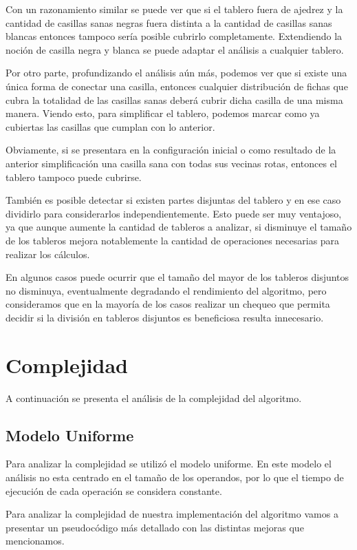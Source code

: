 \documentclass[a4paper, 12pt] {article}
\begin{document}
Con un razonamiento similar se puede ver que si el tablero fuera de ajedrez y la cantidad de casillas sanas negras fuera distinta a la cantidad de casillas sanas blancas entonces tampoco ser\'ia posible cubrirlo completamente. Extendiendo la noci\'on de casilla negra y blanca se puede adaptar el an\'alisis a cualquier tablero.


Por otro parte, profundizando el an\'alisis a\'un m\'as, podemos ver que si existe una \'unica forma de conectar una casilla, entonces cualquier distribuci\'on de fichas que cubra la totalidad de las casillas sanas deber\'a cubrir dicha casilla de una misma manera. Viendo esto, para simplificar el tablero, podemos marcar como ya cubiertas las casillas que cumplan con lo anterior.


Obviamente, si se presentara en la configuraci\'on inicial o como resultado de la anterior simplificaci\'on una casilla sana con todas sus vecinas rotas, entonces el tablero tampoco puede cubrirse.


Tambi\'en es posible detectar si existen partes disjuntas del tablero y en ese caso dividirlo para considerarlos independientemente. Esto puede ser muy ventajoso, ya que aunque aumente la cantidad de tableros a analizar, si disminuye el tama\~no de los tableros mejora notablemente la cantidad de operaciones necesarias para realizar los c\'alculos. 


En algunos casos puede ocurrir que el tama\~no del mayor de los tableros disjuntos no disminuya, eventualmente degradando el rendimiento del algoritmo, pero consideramos que en la mayor\'ia de los casos realizar un chequeo que permita decidir si la divisi\'on en tableros disjuntos es beneficiosa resulta innecesario.
\section*{Complejidad}
A continuaci\'on se presenta el an\'alisis de la complejidad del algoritmo.


\subsection*{Modelo Uniforme}
Para analizar la complejidad se utiliz\'o el modelo uniforme. En este modelo el an\'alisis no esta centrado en el tama\~{n}o de los operandos, por lo que el tiempo de ejecuci\'on de cada operaci\'on se considera constante.


Para analizar la complejidad de nuestra implementaci\'on del algoritmo vamos a presentar un pseudoc\'odigo m\'as detallado con las distintas mejoras que mencionamos.
\end{document}
